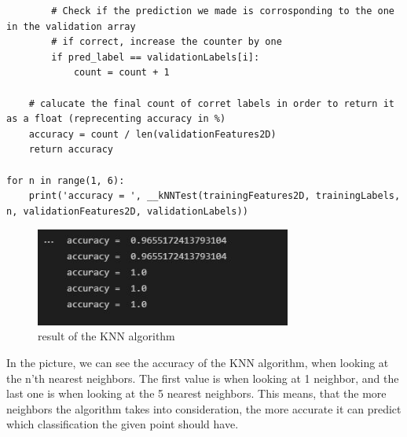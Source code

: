 \begin{verbatim}
        # Check if the prediction we made is corrosponding to the one in the validation array
        # if correct, increase the counter by one
        if pred_label == validationLabels[i]:
            count = count + 1

    # calucate the final count of corret labels in order to return it as a float (reprecenting accuracy in %)
    accuracy = count / len(validationFeatures2D)
    return accuracy

for n in range(1, 6):
    print('accuracy = ', __kNNTest(trainingFeatures2D, trainingLabels, n, validationFeatures2D, validationLabels))

\end{verbatim}

\begin{figure}[H]
    \centering
    \includegraphics[width=0.75\textwidth]{Figures/KNN_result.JPG}
    \caption{result of the KNN algorithm}
\end{figure}

In the picture, we can see the accuracy of the KNN algorithm, when looking at the
n'th nearest neighbors. The first value is when looking at 1 neighbor, and the last one
is when looking at the 5 nearest neighbors.
This means, that the more neighbors the algorithm takes into consideration, the more accurate it
can predict which classification the given point should have.
